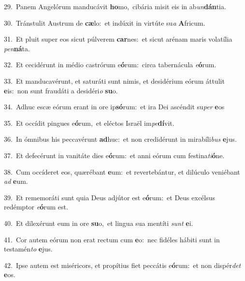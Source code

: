 {\numbfont\textcolor{\numbcolor}{29.}}~Panem Angelórum manducávit \textbf{ho}\-mo,~\star cibária misit eis in ab\-\textit{un}\-\textbf{dán}tia.\par
{\numbfont\textcolor{\numbcolor}{30.}}~Tránstulit Austrum de \textbf{cæ}\-lo:~\star et indúxit in virtúte su\textit{a} \textbf{A}\-fricum.\par
{\numbfont\textcolor{\numbcolor}{31.}}~Et pluit super eos sicut púlverem \textbf{car}\-nes:~\star et sicut arénam maris volatília \textit{pen}\-\textbf{ná}ta.\par
{\numbfont\textcolor{\numbcolor}{32.}}~Et cecidérunt in médio castrórum e\-\textbf{ó}\-rum:~\star circa tabernácula \textit{e}\-\textbf{ó}rum.\par
{\numbfont\textcolor{\numbcolor}{33.}}~Et manducavérunt, et saturáti sunt nimis, et desidérium eórum áttulit \textbf{e}\-is:~\star non sunt fraudáti a desidéri\textit{o} \textbf{su}\-o.\par
{\numbfont\textcolor{\numbcolor}{34.}}~Adhuc escæ eórum erant in ore ip\-\textbf{só}\-rum:~\star et ira Dei ascéndit su\textit{per} \textbf{e}\-os\par
{\numbfont\textcolor{\numbcolor}{35.}}~Et occídit pingues e\-\textbf{ó}\-rum,~\star et eléctos Israël im\-\textit{pe}\-\textbf{dí}vit.\par
{\numbfont\textcolor{\numbcolor}{36.}}~In ómnibus his peccavérunt \textbf{ad}\-huc:~\star et non credidérunt in mirabíli\textit{bus} \textbf{e}\-jus.\par
{\numbfont\textcolor{\numbcolor}{37.}}~Et defecérunt in vanitáte dies e\-\textbf{ó}\-rum:~\star et anni eórum cum festina\-\textit{ti}\-\textbf{ó}ne.\par
{\numbfont\textcolor{\numbcolor}{38.}}~Cum occíderet eos, quærébant \textbf{e}\-um:~\star et revertebántur, et dilúculo veniébant \textit{ad} \textbf{e}\-um.\par
{\numbfont\textcolor{\numbcolor}{39.}}~Et rememoráti sunt quia Deus adjútor est e\-\textbf{ó}\-rum:~\star et Deus excélsus redémptor \textit{e}\-\textbf{ó}rum est.\par
{\numbfont\textcolor{\numbcolor}{40.}}~Et dilexérunt eum in ore \textbf{su}\-o,~\star et lingua sua mentíti \textit{sunt} \textbf{e}\-i.\par
{\numbfont\textcolor{\numbcolor}{41.}}~Cor autem eórum non erat rectum cum \textbf{e}\-o:~\star nec fidéles hábiti sunt in testamén\textit{to} \textbf{e}\-jus.\par
{\numbfont\textcolor{\numbcolor}{42.}}~Ipse autem est miséricors, et propítius fiet peccátis e\-\textbf{ó}\-rum:~\star et non dispér\textit{det} \textbf{e}\-os.\par
